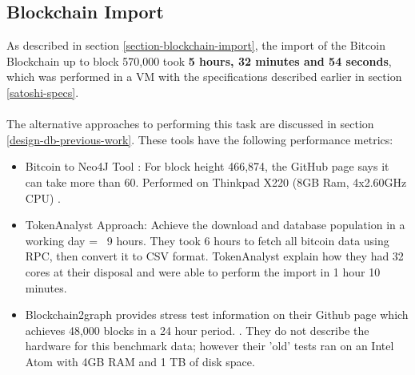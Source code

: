 \subsection{Blockchain Import}
As described in section \ref{section-blockchain-import}, the import of the Bitcoin Blockchain up to block 570,000 took \textbf{5 hours, 32 minutes and 54 seconds}, which was performed in a VM with the specifications described earlier in section \ref{satoshi-specs}.
\\\\
The alternative approaches to performing this task are discussed in section \ref{design-db-previous-work}. These tools have the following performance metrics:
\begin{itemize}
    \item Bitcoin to Neo4J Tool : For block height 466,874, the GitHub page says it can take more than 60. Performed on Thinkpad X220 (8GB Ram, 4x2.60GHz CPU) \cite{RefWorks:doc:5c98e031e4b068320632cef2}. 
    \item TokenAnalyst Approach: Achieve the download and database population in a working day = ~9 hours. They took 6 hours to fetch all bitcoin data using RPC, then convert it to CSV format. TokenAnalyst explain how they had 32 cores at their disposal and were able to perform the import in 1 hour 10 minutes. 
    \cite{RefWorks:doc:5c98e0cde4b044512c0b8641}
    \item Blockchain2graph provides stress test information on their Github page which achieves 48,000 blocks in a 24 hour period.  \cite{RefWorks:doc:5cac6184e4b01c076c63e173}. They do not describe the hardware for this benchmark data; however their 'old' tests ran on an Intel Atom with 4GB RAM and 1 TB of disk space. 
\end{itemize}


